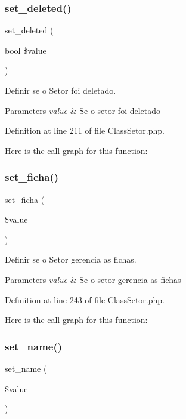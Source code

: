 \subsubsection{\texorpdfstring{set\+\_\+deleted()}{set\_deleted()}}
{\footnotesize\ttfamily set\+\_\+deleted (\begin{DoxyParamCaption}\item[{bool}]{\$value }\end{DoxyParamCaption})}



Definir se o Setor foi deletado. 


\begin{DoxyParams}{Parameters}
{\em value} & Se o setor foi deletado \\
\hline
\end{DoxyParams}


Definition at line 211 of file Class\+Setor.\+php.

Here is the call graph for this function\+:
\mbox{\label{class_class_setor_a592f14a6c34825448b303800bf41b1bb}} 
\subsubsection{\texorpdfstring{set\+\_\+ficha()}{set\_ficha()}}
{\footnotesize\ttfamily set\+\_\+ficha (\begin{DoxyParamCaption}\item[{}]{\$value }\end{DoxyParamCaption})}



Definir se o Setor gerencia as fichas. 


\begin{DoxyParams}{Parameters}
{\em value} & Se o setor gerencia as fichas \\
\hline
\end{DoxyParams}


Definition at line 243 of file Class\+Setor.\+php.

Here is the call graph for this function\+:
\mbox{\label{class_class_setor_a53e29da8f1da63502f3e13091fcb74e5}} 
\subsubsection{\texorpdfstring{set\+\_\+name()}{set\_name()}}
{\footnotesize\ttfamily set\+\_\+name (\begin{DoxyParamCaption}\item[{}]{\$value }\end{DoxyParamCaption})}



